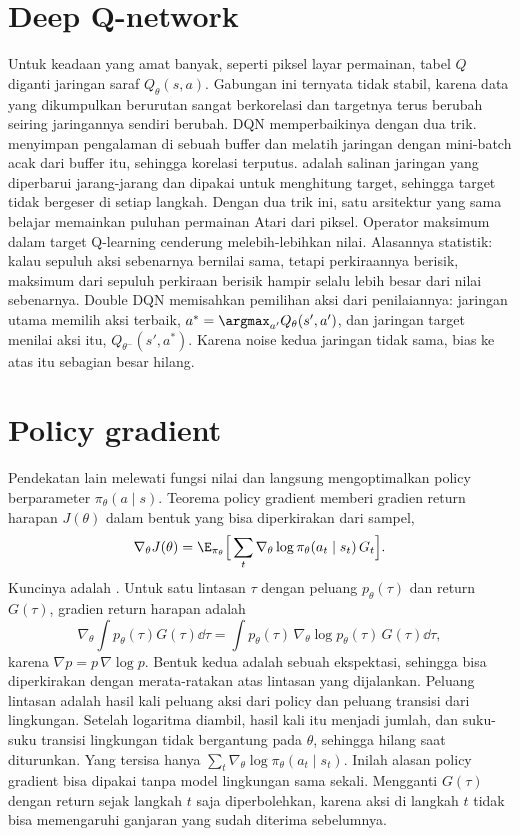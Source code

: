 \section{Deep Q-network}

Untuk keadaan yang amat banyak, seperti piksel layar permainan, tabel $Q$ diganti jaringan saraf
$Q_\theta(s,a)$. Gabungan ini ternyata tidak stabil, karena data yang dikumpulkan berurutan sangat
berkorelasi dan targetnya terus berubah seiring jaringannya sendiri berubah. DQN \citep{mnih2015}
memperbaikinya dengan dua trik.  menyimpan pengalaman di sebuah buffer dan
melatih jaringan dengan mini-batch acak dari buffer itu, sehingga korelasi terputus.  adalah salinan jaringan yang diperbarui jarang-jarang dan dipakai untuk menghitung target,
sehingga target tidak bergeser di setiap langkah. Dengan dua trik ini, satu arsitektur yang sama
belajar memainkan puluhan permainan Atari dari piksel. Operator maksimum dalam target Q-learning
cenderung melebih-lebihkan nilai. Alasannya statistik: kalau sepuluh aksi sebenarnya bernilai sama, tetapi perkiraannya
berisik, maksimum dari sepuluh perkiraan berisik hampir selalu lebih besar dari nilai sebenarnya. Double DQN memisahkan
pemilihan aksi dari penilaiannya: jaringan utama memilih aksi terbaik, $a^*=\argmax_{a'}Q_\theta(s',a')$, dan jaringan
target menilai aksi itu, $Q_{\theta^-}(s',a^*)$. Karena noise kedua jaringan tidak sama, bias ke atas itu sebagian besar
hilang.

\section{Policy gradient}

Pendekatan lain melewati fungsi nilai dan langsung mengoptimalkan policy berparameter
$\pi_\theta(a\mid s)$. Teorema policy gradient memberi gradien return harapan $J(\theta)$ dalam bentuk
yang bisa diperkirakan dari sampel,
\begin{equation}
\nabla_\theta J(\theta)=\E_{\pi_\theta}\Big[\sum_t\nabla_\theta\log\pi_\theta(a_t\mid s_t)\,G_t\Big].
\end{equation}
Kuncinya adalah . Untuk satu lintasan $\tau$ dengan peluang $p_\theta(\tau)$
dan return $G(\tau)$, gradien return harapan adalah
\[
\nabla_\theta\int p_\theta(\tau)G(\tau)\dd\tau=\int p_\theta(\tau)\,\nabla_\theta\log p_\theta(\tau)\,G(\tau)\dd\tau,
\]
karena $\nabla p=p\,\nabla\log p$. Bentuk kedua adalah sebuah ekspektasi, sehingga bisa diperkirakan dengan
merata-ratakan atas lintasan yang dijalankan. Peluang lintasan adalah hasil kali peluang aksi dari
policy dan peluang transisi dari lingkungan. Setelah logaritma diambil, hasil kali itu menjadi jumlah,
dan suku-suku transisi lingkungan tidak bergantung pada $\theta$, sehingga hilang saat diturunkan.
Yang tersisa hanya $\sum_t\nabla_\theta\log\pi_\theta(a_t\mid s_t)$. Inilah alasan policy gradient bisa
dipakai tanpa model lingkungan sama sekali. Mengganti $G(\tau)$ dengan return sejak langkah $t$ saja
diperbolehkan, karena aksi di langkah $t$ tidak bisa memengaruhi ganjaran yang sudah diterima sebelumnya.


